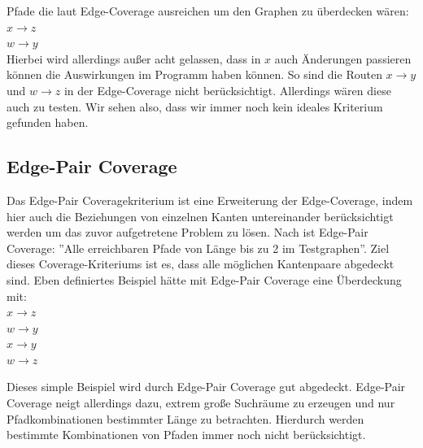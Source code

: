 Pfade die laut Edge-Coverage ausreichen um den Graphen zu überdecken wären: \\
$ x \rightarrow z $ \\
$ w \rightarrow y $ \\
Hierbei wird allerdings außer acht gelassen, dass in $x$ auch Änderungen passieren können die Auswirkungen im Programm haben können.
So sind die Routen $ x \rightarrow y $ und $ w \rightarrow z $ in der Edge-Coverage nicht berücksichtigt.
Allerdings wären diese auch zu testen.
Wir sehen also, dass wir immer noch kein ideales Kriterium gefunden haben.


\subsection{Edge-Pair Coverage}

Das Edge-Pair Coveragekriterium ist eine Erweiterung der Edge-Coverage, indem hier auch die Beziehungen von einzelnen Kanten untereinander berücksichtigt werden um das zuvor
aufgetretene Problem zu lösen.
Nach \cite[Introduction to Software Testing]{software-testing} ist Edge-Pair Coverage: ''Alle erreichbaren Pfade von Länge bis zu 2 im Testgraphen''.
Ziel dieses Coverage-Kriteriums ist es, dass alle möglichen Kantenpaare abgedeckt sind.
Eben definiertes Beispiel hätte mit Edge-Pair Coverage eine Überdeckung mit: \\
$ x \rightarrow z $ \\
$ w \rightarrow y $ \\
$ x \rightarrow y $ \\
$ w \rightarrow z $

Dieses simple Beispiel wird durch Edge-Pair Coverage gut abgedeckt.
Edge-Pair Coverage neigt allerdings dazu, extrem große Suchräume zu erzeugen und nur Pfadkombinationen bestimmter Länge zu betrachten. \cite[vgl. S. 35]{software-testing}
Hierdurch werden bestimmte Kombinationen von Pfaden immer noch nicht berücksichtigt.


